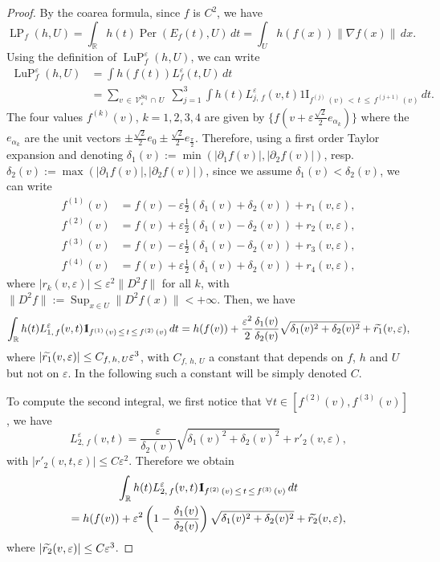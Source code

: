 \documentclass[AHL,Unicode,longabstracts,published]{cedram}
\newcommand{\R}{\mathbb{R}}
\newcommand{\ind}{{1\!\!\mathrm{I}}}
\newcommand{\eps}{\varepsilon}
\DeclareMathOperator{\LP}{LP}
\DeclareMathOperator{\LuP}{LuP}
\DeclareMathOperator{\Per}{Per}
\DeclareMathOperator{\Sq}{Sq}
\DeclareMathOperator{\Sup}{Sup}
\newcommand{\calV}{\mathcal{V}}
\let\oldtilde\tilde
\renewcommand*{\tilde}[1]{\mathchoice{\widetilde{#1}}{\widetilde{#1}}{\oldtilde{#1}}{\oldtilde{#1}}}
\let\oldforall\forall
\renewcommand*{\forall}{\mathrel{\oldforall}}
\begin{document}
\begin{proof}
By the coarea formula, since $f$ is $C^2$, we have
\[
\LP_f(h,U) = \int_\R h(t) \Per\left(E_f(t),U\right) \, dt = \int_U h(f(x))
\left\| \nabla f(x) \right\| \, dx.
\]
Using the definition of $\LuP_f^\eps(h,U)$, we can write
\begin{align*}
\LuP_f^\eps(h,U) &= \int h(f(t)) L_f^\eps(t,U) \, dt\\
&=\sum_{v\,\in\,\calV^{\Sq}_\eps\,\cap\,U}\; \sum_{j=1}^3 \int h(t)
L_{j,\,f}^\eps(v,t) \ind_{f^{(j)}\,(v)\,<\,t\,\leq\,f^{(j+1)}\,(v)} \, dt.
\end{align*}
The four values $f^{(k)}(v)$, $k=1,2,3,4$ are given by $\{ f(v +
\eps\tfrac{\sqrt{2}}{2}e_{\alpha_k})\}$ where the $e_{\alpha_k}$ are the unit vectors $\pm \frac{\sqrt{2}}{2} e_0 \pm \frac{\sqrt{2}}{2} e_{\frac{\pi}{2}}$. Therefore, using a first order Taylor expansion and denoting $\delta_1(v):=\min (|\partial_1 f(v)|, |\partial_2 f(v)|)$, resp. $\delta_2(v):=\max(|\partial_1 f(v)|, |\partial_2 f(v)|)$, since we assume $\delta_1(v)<\delta_2(v)$, we can write
\begin{align*}
f^{(1)}(v) &= f(v) - \eps \frac{1}{2}\left(\delta_1(v) + \delta_2(v)\right) + r_1(v,\eps),\\
f^{(2)}(v) &= f(v) + \eps \frac{1}{2}\left(\delta_1(v) - \delta_2(v)\right) + r_2(v,\eps) ,\\
f^{(3)}(v) &= f(v) - \eps \frac{1}{2}\left(\delta_1(v) - \delta_2(v)\right) + r_3(v,\eps),\\
f^{(4)}(v) &= f(v) + \eps \frac{1}{2}\left(\delta_1(v) + \delta_2(v)\right) + r_4(v,\eps),
\end{align*}
where $|r_k(v,\eps)|\leq \eps^2 \|D^2f\|$ for all $k$, with $\|D^2f\|:= \Sup_{x\in U} \| D^2f(x)\| < +\infty $. Then, we have
\[
\int_\R h(t)
L_{1,\,f}^\eps(v,t) \ind_{f^{(1)}\,(v)\,\leq\,t\,\leq\,f^{(2)}\,(v)} \, dt = h(f(v)) + \frac{\eps^2}{2} \frac{\delta_1(v)}{\delta_2(v)}
\sqrt{\delta_1(v)^2 + \delta_2(v)^2 } + \tilde{r_1}(v,\eps),
\]
where
$|\tilde{r_1}(v,\eps)|\leq C_{f,\,h,\,U} \eps^3$, with $C_{f,\,h,\,U}$ a constant that depends on $f$, $h$ and $U$ but not on $\eps$. In the following such a constant will be simply denoted $C$.

To compute the second integral, we first notice that $\forall t\in[f^{(2)}(v),f^{(3)}(v)]$, we have
\[
L_{2,\,f}^\eps(v,t)=
\frac{\eps}{\delta_2(v)} \sqrt{\delta_1(v)^2 + \delta_2(v)^2 } +
r'_2(v,\eps),
\]
with $|r'_2(v,t,\eps)|\leq C\eps^2$. Therefore we
obtain
\begin{multline*}
\int_\R h(t)
L_{2,\,f}^\eps(v,t) \ind_{f^{(2)}\,(v)\,\leq\,t\,\leq\,f^{(3)}\,(v)} \, dt \\
= h(f(v)) + \eps^2 \left(1-\frac{\delta_1(v)}{\delta_2(v)}\right)
\sqrt{\delta_1(v)^2 + \delta_2(v)^2 } + \tilde{r_2}(v,\eps),
\end{multline*}
where
$|\tilde{r_2}(v,\eps)|\leq C \eps^3$.


\end{proof}
\end{document}
